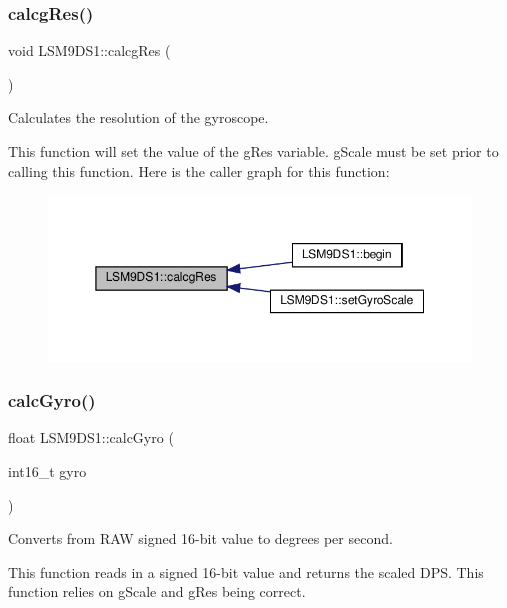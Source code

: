 \subsubsection{\texorpdfstring{calcg\+Res()}{calcgRes()}}
{\footnotesize\ttfamily void L\+S\+M9\+D\+S1\+::calcg\+Res (\begin{DoxyParamCaption}{ }\end{DoxyParamCaption})\hspace{0.3cm}{\ttfamily [protected]}}



Calculates the resolution of the gyroscope. 

This function will set the value of the g\+Res variable. g\+Scale must be set prior to calling this function. Here is the caller graph for this function\+:
\nopagebreak
\begin{figure}[H]
\begin{center}
\leavevmode
\includegraphics[width=350pt]{classLSM9DS1_a303e0dd33e000579dc3917aecedb6e63_icgraph}
\end{center}
\end{figure}
\mbox{\label{classLSM9DS1_a76707323565bc4170ea8e27a932c95e4}} 
\subsubsection{\texorpdfstring{calc\+Gyro()}{calcGyro()}}
{\footnotesize\ttfamily float L\+S\+M9\+D\+S1\+::calc\+Gyro (\begin{DoxyParamCaption}\item[{int16\+\_\+t}]{gyro }\end{DoxyParamCaption})}



Converts from R\+AW signed 16-\/bit value to degrees per second. 

This function reads in a signed 16-\/bit value and returns the scaled D\+PS. This function relies on g\+Scale and g\+Res being correct.


